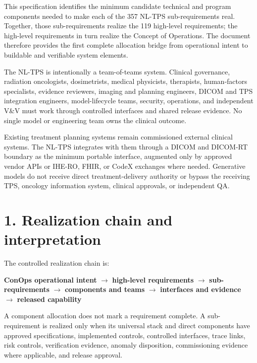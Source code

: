 \documentclass[11pt,letterpaper]{article}
\begin{document}

This specification identifies the minimum candidate technical and program components needed to make each of the 357 NL-TPS sub-requirements real. Together, those sub-requirements realize the 119 high-level requirements; the high-level requirements in turn realize the Concept of Operations. The document therefore provides the first complete allocation bridge from operational intent to buildable and verifiable system elements.

The NL-TPS is intentionally a team-of-teams system. Clinical governance, radiation oncologists, dosimetrists, medical physicists, therapists, human-factors specialists, evidence reviewers, imaging and planning engineers, DICOM and TPS integration engineers, model-lifecycle teams, security, operations, and independent V\&V must work through controlled interfaces and shared release evidence. No single model or engineering team owns the clinical outcome.

Existing treatment planning systems remain commissioned external clinical systems. The NL-TPS integrates with them through a DICOM and DICOM-RT boundary as the minimum portable interface, augmented only by approved vendor APIs or IHE-RO, FHIR, or CodeX exchanges where needed. Generative models do not receive direct treatment-delivery authority or bypass the receiving TPS, oncology information system, clinical approvals, or independent QA.

\section{1. Realization chain and interpretation}

The controlled realization chain is:
\begin{center}
\textbf{ConOps operational intent} $\rightarrow$ \textbf{high-level requirements} $\rightarrow$ \textbf{sub-requirements} $\rightarrow$ \textbf{components and teams} $\rightarrow$ \textbf{interfaces and evidence} $\rightarrow$ \textbf{released capability}
\end{center}

A component allocation does not mark a requirement complete. A sub-requirement is realized only when its universal stack and direct components have approved specifications, implemented controls, controlled interfaces, trace links, risk controls, verification evidence, anomaly disposition, commissioning evidence where applicable, and release approval.
\end{document}
